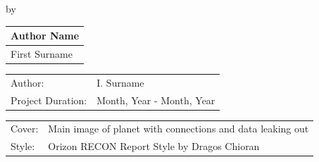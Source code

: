 \begin{titlepage}

\begin{center}

{\makeatletter
\largetitlestyle\fontsize{45}{45}\selectfont\@title
\makeatother}

{\makeatletter
\ifdefvoid{\@subtitle}{}{\bigskip\titlestyle\fontsize{20}{20}\selectfont\@subtitle}
\makeatother}

\bigskip
\bigskip

by

\bigskip
\bigskip

{\makeatletter
\largetitlestyle\fontsize{25}{25}\selectfont\@author
\makeatother}

\bigskip
\bigskip

\setlength\extrarowheight{2pt}
\begin{tabular}{l}
    Author Name \\\midrule
    First Surname \\
\end{tabular}

\vfill

\begin{tabular}{ll}
    Author: & I. Surname \\
    Project Duration: & Month, Year - Month, Year \\
\end{tabular}

\bigskip
\bigskip

\begin{tabular}{p{15mm}p{10cm}}
    Cover: & Main image of planet with connections and data leaking out \\
    Style: & Orizon RECON Report Style by Dragos Chioran
\end{tabular}

\end{center}


\end{titlepage}
